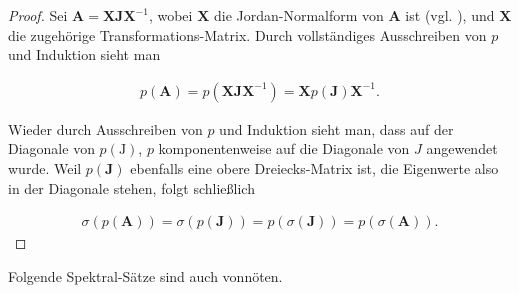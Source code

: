             \begin{proof}

                Sei $\mathbf A = \mathbf X \mathbf J \mathbf X^{-1}$, wobei $\mathbf X$ die Jordan-Normalform von $\mathbf A$ ist (vgl. \cite[Kapitel 8.7]{LinAG1&2}), und $\mathbf X$ die zugehörige Transformations-Matrix.
                Durch vollständiges Ausschreiben von $p$ und Induktion sieht man

                \begin{align*}
                    p(\mathbf A)
                    =
                    p(\mathbf X \mathbf J \mathbf X^{-1})
                    =
                    \mathbf X p(\mathbf J) \mathbf X^{-1}.
                \end{align*}

                Wieder durch Ausschreiben von $p$ und Induktion sieht man, dass auf der Diagonale von $p(\mathrm J)$, $p$ komponentenweise auf die Diagonale von $J$ angewendet wurde.
                Weil $p(\mathbf J)$ ebenfalls eine obere Dreiecks-Matrix ist, die Eigenwerte also in der Diagonale stehen, folgt schließlich

                \begin{align*}
                    \sigma(p(\mathbf A))
                    =
                    \sigma(p(\mathbf J))
                    =
                    p(\sigma(\mathbf J))
                    =
                    p(\sigma(\mathbf A)).
                \end{align*}

            \end{proof}

            Folgende Spektral-Sätze sind auch vonnöten.

